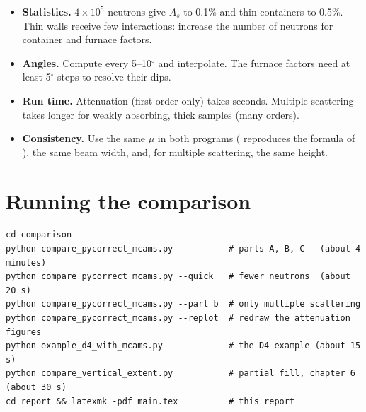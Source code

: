 \documentclass[11pt,a4paper]{report}
\begin{document}
\begin{itemize}
  \item \textbf{Statistics.} $4\times10^5$ neutrons give $A_s$ to 0.1\% and thin
        containers to 0.5\%. Thin walls receive few interactions: increase the
        number of neutrons for container and furnace factors.
  \item \textbf{Angles.} Compute every 5--10$^\circ$ and interpolate. The furnace
        factors need at least 5$^\circ$ steps to resolve their dips.
  \item \textbf{Run time.} Attenuation (first order only) takes seconds.
        Multiple scattering takes longer for weakly absorbing, thick samples
        (many orders).
  \item \textbf{Consistency.} Use the same $\mu$ in both programs
        ( reproduces the formula of \pyc), the same beam
        width, and, for multiple scattering, the same height.
\end{itemize}

\chapter{Running the comparison}

\begin{lstlisting}[style=shell]
cd comparison
python compare_pycorrect_mcams.py           # parts A, B, C   (about 4 minutes)
python compare_pycorrect_mcams.py --quick   # fewer neutrons  (about 20 s)
python compare_pycorrect_mcams.py --part b  # only multiple scattering
python compare_pycorrect_mcams.py --replot  # redraw the attenuation figures
python example_d4_with_mcams.py             # the D4 example (about 15 s)
python compare_vertical_extent.py           # partial fill, chapter 6 (about 30 s)
cd report && latexmk -pdf main.tex          # this report
\end{lstlisting}
\end{document}
